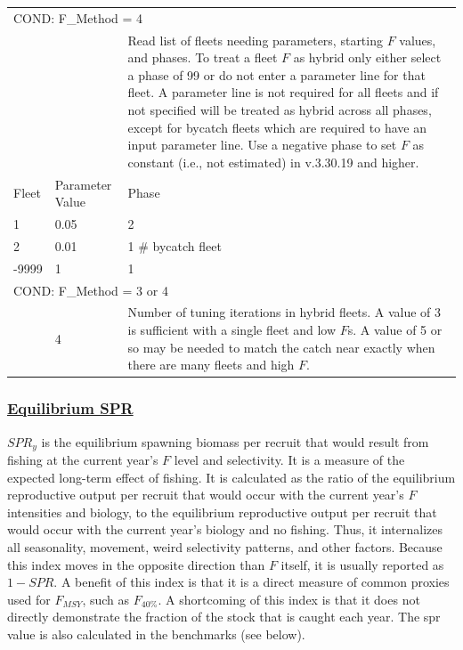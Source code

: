 \begin{longtable}{p{1cm} p{3cm} p{11cm}}
	\multicolumn{3}{l}{COND: F\_Method = 4} \Tstrut\\
	& & Read list of fleets needing parameters, starting $F$ values, and phases. To treat a fleet $F$ as hybrid only either select a phase of 99 or do not enter a parameter line for that fleet. A parameter line is not required for all fleets and if not specified will be treated as hybrid across all phases, except for bycatch fleets which are required to have an input parameter line. Use a negative phase to set $F$ as constant (i.e., not estimated) in v.3.30.19 and higher. \Tstrut\\
	Fleet & Parameter Value & Phase \Tstrut\\
	1 & 0.05 & 2 \\
	2 & 0.01 & 1 \# bycatch fleet \\
	-9999 & 1 & 1 \Bstrut\\
	\hline
 
	\multicolumn{3}{l}{COND: F\_Method = 3 or 4} \Tstrut\\
	& 4 & Number of tuning iterations in hybrid fleets. A value of 3 is sufficient with a single fleet and low $F$s. A value of 5 or so may be needed to match the catch near exactly when there are many fleets and high $F$. \Bstrut\\
	\hline
\end{longtable}

\hypertarget{EquilSPR}{}
\subsubsection[Equilibrium SPR]{\protect\hyperlink{EquilSPR}{Equilibrium SPR}}
$SPR_y$ is the equilibrium spawning biomass per recruit that would result from fishing at the current year’s $F$ level and selectivity. It is a measure of the expected long-term effect of fishing. It is calculated as the ratio of the equilibrium reproductive output per recruit that would occur with the current year's $F$ intensities and biology, to the equilibrium reproductive output per recruit that would occur with the current year's biology and no fishing. Thus, it internalizes all seasonality, movement, weird selectivity patterns, and other factors. Because this index moves in the opposite direction than $F$ itself, it is usually reported as $1-SPR$. A benefit of this index is that it is a direct measure of common proxies used for $F_{MSY}$, such as $F_{40\%}$. A shortcoming of this index is that it does not directly demonstrate the fraction of the stock that is caught each year. The \gls{spr} value is also calculated in the benchmarks (see below). 

